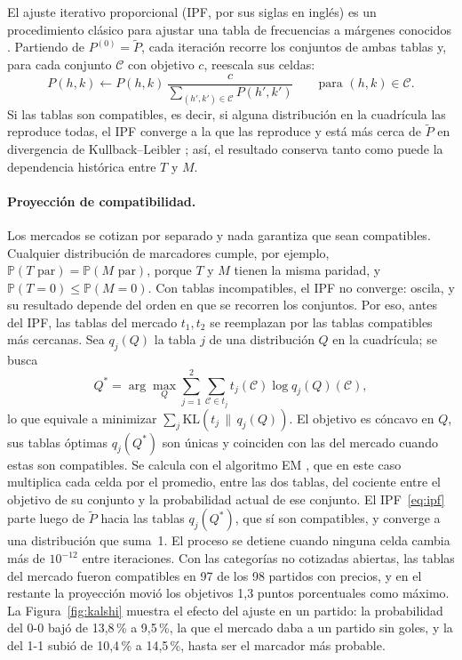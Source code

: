 \documentclass[12pt]{article}
\theoremstyle{plain}
\theoremstyle{remark}
\newcommand{\Prob}{\mathbb{P}}
\begin{document}
El ajuste iterativo proporcional (IPF, por sus siglas en inglés) es un
procedimiento clásico para ajustar una tabla de frecuencias a márgenes
conocidos \citep{deming1940}.
Partiendo de $P^{(0)} = \tilde{P}$, cada iteración recorre los
conjuntos de ambas tablas y, para cada conjunto $\mathcal{C}$ con
objetivo $c$, reescala sus celdas:
\begin{equation}
  P(h, k) \leftarrow P(h, k) \,
    \frac{c}{\sum_{(h', k') \in \mathcal{C}} P(h', k')}
  \qquad \text{para } (h, k) \in \mathcal{C}.
  \label{eq:ipf}
\end{equation}
Si las tablas son compatibles, es decir, si alguna distribución en la
cuadrícula las reproduce todas, el IPF converge a la que las reproduce
y está más cerca de $\tilde{P}$ en divergencia de Kullback--Leibler
\citep{csiszar1975}; así, el resultado conserva tanto como puede la
dependencia histórica entre $T$ y $M$.

\paragraph{Proyección de compatibilidad.}
Los mercados se cotizan por separado y nada garantiza que sean
compatibles.
Cualquier distribución de marcadores cumple, por ejemplo,
$\Prob(T \text{ par}) = \Prob(M \text{ par})$, porque $T$ y $M$
tienen la misma paridad, y $\Prob(T = 0) \leq \Prob(M = 0)$.
Con tablas incompatibles, el IPF no converge: oscila, y su resultado
depende del orden en que se recorren los conjuntos.
Por eso, antes del IPF, las tablas del mercado $t_1, t_2$ se
reemplazan por las tablas compatibles más cercanas.
Sea $q_j(Q)$ la tabla $j$ de una distribución $Q$ en la cuadrícula;
se busca
\begin{equation}
  Q^* = \arg\max_Q \sum_{j=1}^{2} \sum_{\mathcal{C} \in t_j}
    t_j(\mathcal{C}) \log q_j(Q)(\mathcal{C}),
  \label{eq:proyeccion}
\end{equation}
lo que equivale a minimizar $\sum_j \mathrm{KL}(t_j \,\|\, q_j(Q))$.
El objetivo es cóncavo en $Q$, sus tablas óptimas $q_j(Q^*)$ son
únicas y coinciden con las del mercado cuando estas son compatibles.
Se calcula con el algoritmo EM \citep{dempster1977}, que en este caso
multiplica cada celda por el promedio, entre las dos tablas, del
cociente entre el objetivo de su conjunto y la probabilidad actual de
ese conjunto.
El IPF~\eqref{eq:ipf} parte luego de $\tilde{P}$ hacia las tablas
$q_j(Q^*)$, que sí son compatibles, y converge a una distribución que
suma~1.
El proceso se detiene cuando ninguna celda cambia más de $10^{-12}$
entre iteraciones.
Con las categorías no cotizadas abiertas, las tablas del mercado
fueron compatibles en 97 de los 98 partidos con precios, y en el
restante la proyección movió los objetivos 1,3 puntos porcentuales
como máximo.
La Figura~\ref{fig:kalshi} muestra el efecto del ajuste en un partido:
la probabilidad del 0-0 bajó de 13,8\,\% a 9,5\,\%, la que el mercado
daba a un partido sin goles, y la del 1-1 subió de 10,4\,\% a
14,5\,\%, hasta ser el marcador más probable.
\end{document}
